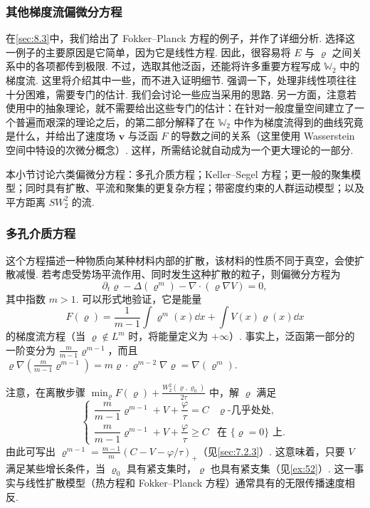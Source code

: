 \subsubsection{其他梯度流偏微分方程}\label{sec:8.4.2}
在\autoref{sec:8.3}中，我们给出了 Fokker--Planck 方程的例子，并作了详细分析. 选择这一例子的主要原因是它简单，因为它是线性方程. 因此，很容易将 $E$ 与 $\varrho$ 之间关系中的各项都传到极限. 不过，选取其他泛函，还能将许多重要方程写成 $\mathbb W_2$ 中的梯度流. 这里将介绍其中一些，而不进入证明细节. 强调一下，处理非线性项往往十分困难，需要专门的估计. 我们会讨论一些应当采用的思路. 另一方面，注意若使用\cite{b15}中的抽象理论，就不需要给出这些专门的估计：在针对一般度量空间建立了一个普遍而艰深的理论之后，\cite{b15}的第二部分解释了在 $\mathbb W_2$ 中作为梯度流得到的曲线究竟是什么，并给出了速度场 $\mathbf v$ 与泛函 $F$ 的导数之间的关系（这里使用 Wasserstein 空间中特设的次微分概念）. 这样，所需结论就自动成为一个更大理论的一部分.

本小节讨论六类偏微分方程：多孔介质方程；Keller--Segel 方程；更一般的聚集模型；同时具有扩散、平流和聚集的更复杂方程；带密度约束的人群运动模型；以及平方距离 $SW_2^2$ 的流.

\subsubsection*{多孔介质方程}
\label{idx:i115-p304}
这个方程描述一种物质向某种材料内部的扩散，该材料的性质不同于真空，会使扩散减慢. 若考虑受势场平流作用、同时发生这种扩散的粒子，则偏微分方程为
\[
\partial_t\varrho-\Delta(\varrho^m)-\nabla\cdot(\varrho\nabla V)=0,
\]
其中指数 $m>1$. 可以形式地验证，它是能量
\[
F(\varrho)=\frac1{m-1}\int\varrho^m(x)\dd x+\int V(x)\varrho(x)\dd x
\]
的梯度流方程（当 $\varrho\notin L^m$ 时，将能量定义为 $+\infty$）. 事实上，泛函第一部分的一阶变分为 $\frac m{m-1}\varrho^{m-1}$，而且
$\varrho\nabla(\frac m{m-1}\varrho^{m-1})=m\varrho\cdot\varrho^{m-2}\nabla\varrho=\nabla(\varrho^m)$.

注意，在离散步骤 $\min_\varrho F(\varrho)+\frac{W_2^2(\varrho,\varrho_0)}{2\tau}$ 中，解 $\varrho$ 满足
\[
\begin{cases}
\dfrac m{m-1}\varrho^{m-1}+V+\dfrac\varphi\tau=C&\varrho\text{-几乎处处},\\[2pt]
\dfrac m{m-1}\varrho^{m-1}+V+\dfrac\varphi\tau\geq C&\text{在 }\{\varrho=0\}\text{ 上}.
\end{cases}
\]
由此可写出 $\varrho^{m-1}=\frac{m-1}m(C-V-\varphi/\tau)_+$（见\autoref{sec:7.2.3}）. 这意味着，只要 $V$ 满足某些增长条件，当 $\varrho_0$ 具有紧支集时，$\varrho$ 也具有紧支集（见\autoref{ex:52}）. 这一事实与线性扩散模型（热方程和 Fokker--Planck 方程）通常具有的无限传播速度相反.

